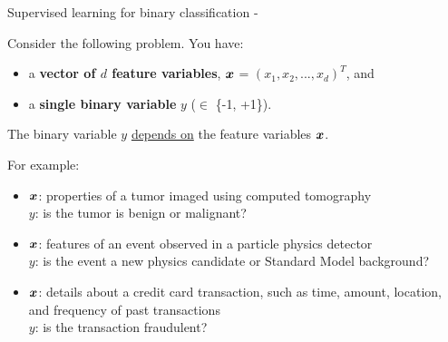 %
%
%

\begin{frame}[t,allowframebreaks]{Supervised learning for binary classification -}

    Consider the following problem. You have:
    \begin{itemize}
        \item a {\bf vector of $d$ feature variables}, $\boldsymbol{x}$ = $(x_1, x_2, ..., x_d)^T$, and
        \item a {\bf single binary variable} $y$ ($\in$ \{-1, +1\}).   
    \end{itemize}
    The binary variable $y$ \underline{depends on} the feature variables $\boldsymbol{x}$.\\
    \vspace{0.2cm}

    \begin{blockexample}{}
        \small
        For example:
        \begin{itemize}
            \small
            \item 
                $\boldsymbol{x}$: properties of a tumor imaged using computed tomography\\ 
                $y$: is the tumor is benign or malignant?
            \item 
                $\boldsymbol{x}$: features of an event observed in a particle physics detector\\ 
                $y$: is the event a new physics candidate 
                  or Standard Model background?
            \item 
                $\boldsymbol{x}$: details about a credit card transaction, such
                   as time, amount, location, and frequency of past transactions\\
                $y$: is the transaction fraudulent?
        \end{itemize}
    \end{blockexample}

    \framebreak


\end{frame}
